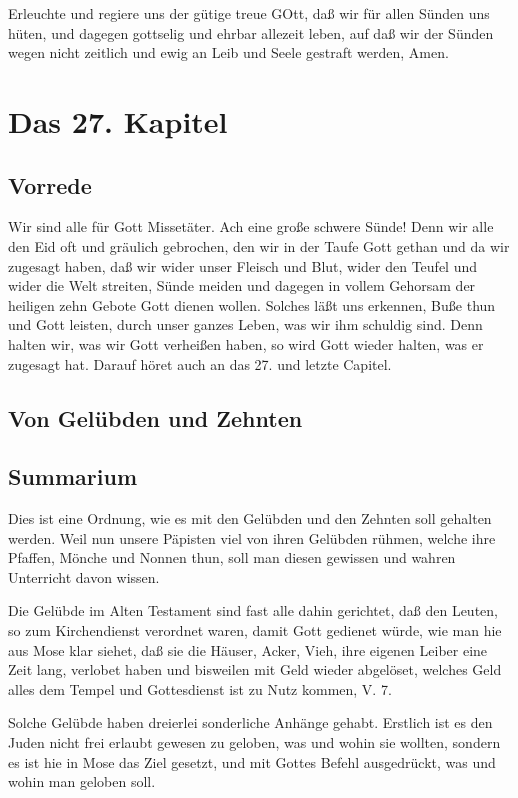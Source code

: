 Erleuchte und regiere uns der gütige treue GOtt, daß wir für allen Sünden uns hüten, und dagegen gottselig und ehrbar allezeit leben, auf daß wir der Sünden wegen nicht zeitlich und ewig an Leib und Seele gestraft werden, Amen.

\chapter{Das 27. Kapitel}

\section{Vorrede}

Wir sind alle für Gott Missetäter. Ach eine große schwere Sünde! Denn wir alle den Eid oft und gräulich gebrochen, den wir in der Taufe Gott gethan und da wir zugesagt haben, daß wir wider unser Fleisch und Blut, wider den Teufel und wider die Welt streiten, Sünde meiden und dagegen in vollem Gehorsam der heiligen zehn Gebote Gott dienen wollen. Solches läßt uns erkennen, Buße thun und Gott leisten, durch unser ganzes Leben, was wir ihm schuldig sind. Denn halten wir, was wir Gott verheißen haben, so wird Gott wieder halten, was er zugesagt hat. Darauf höret auch an das 27. und letzte Capitel.

\section{Von Gelübden und Zehnten}

\section{Summarium}

Dies ist eine Ordnung, wie es mit den Gelübden und den Zehnten soll gehalten werden. Weil nun unsere Päpisten viel von ihren Gelübden rühmen, welche ihre Pfaffen, Mönche und Nonnen thun, soll man diesen gewissen und wahren Unterricht davon wissen.

Die Gelübde im Alten Testament sind fast alle dahin gerichtet, daß den Leuten, so zum Kirchendienst verordnet waren, damit Gott gedienet würde, wie man hie aus Mose klar siehet, daß sie die Häuser, Acker, Vieh, ihre eigenen Leiber eine Zeit lang, verlobet haben und bisweilen mit Geld wieder abgelöset, welches Geld alles dem Tempel und Gottesdienst ist zu Nutz kommen, V. 7.

Solche Gelübde haben dreierlei sonderliche Anhänge gehabt. Erstlich ist es den Juden nicht frei erlaubt gewesen zu geloben, was und wohin sie wollten, sondern es ist hie in Mose das Ziel gesetzt, und mit Gottes Befehl ausgedrückt, was und wohin man geloben soll.

